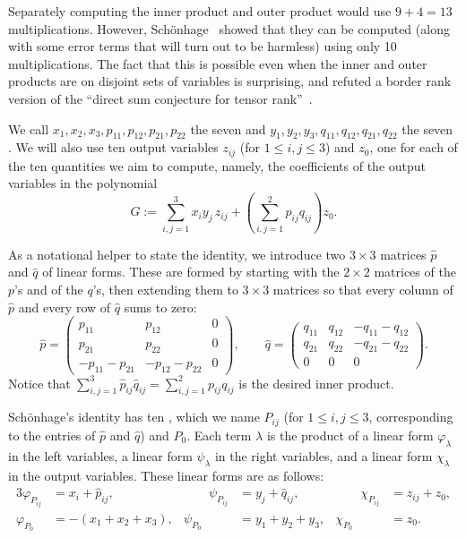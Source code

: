 Separately computing the inner product and outer product would use $9 + 4 = 13$ multiplications. However, Sch\"onhage~\cite[\S6, eq.~(6.3), with $k=n=3$]{Sch81} showed that they can be computed (along with some error terms that will turn out to be harmless) using only 10 multiplications. The fact that this is possible even when the inner and outer products are on disjoint sets of variables is surprising, and refuted a border rank version of the ``direct sum conjecture for tensor rank''~\cite{Str73}.

We call $x_1,x_2,x_3,\allowbreak p_{11},p_{12},p_{21},p_{22}$ the seven  and $y_1,y_2,y_3,\allowbreak q_{11},q_{12},q_{21},q_{22}$ the seven . We will also use ten output variables $z_{ij}$ (for $1 \leq i,j \leq 3$) and $z_0$, one for each of the ten quantities we aim to compute, namely, the coefficients of the output variables in the polynomial
\[
G:=\sum_{i,j=1}^3 x_iy_j\,z_{ij}+\left(\sum_{i,j=1}^2 p_{ij}q_{ij}\right)z_0 .
\]

As a notational helper to state the identity, we introduce two $3\times3$ matrices $\hat p$ and $\hat q$ of linear forms. These are formed by starting with the $2\times2$ matrices of the $p$'s and of the $q$'s, then extending them to $3 \times 3$ matrices so that every column of $\hat p$ and every row of $\hat q$ sums to zero:
\[
\hat p=\begin{pmatrix} p_{11}&p_{12}&0\\ p_{21}&p_{22}&0\\ -p_{11}-p_{21}&-p_{12}-p_{22}&0\end{pmatrix},\qquad
\hat q=\begin{pmatrix} q_{11}&q_{12}&-q_{11}-q_{12}\\ q_{21}&q_{22}&-q_{21}-q_{22}\\ 0&0&0\end{pmatrix}.
\]
Notice that $\sum_{i,j=1}^{3}\hat p_{ij}\hat q_{ij}=\sum_{i,j=1}^{2}p_{ij}q_{ij}$ is the desired inner product.


Sch\"onhage's identity has ten , which we name $P_{ij}$ (for $1\le i,j\le3$, corresponding to the entries of $\hat p$ and $\hat q$) and $P_0$. Each term $\lambda$ is the product of a linear form $\varphi_\lambda$ in the left variables, a linear form $\psi_\lambda$ in the right variables, and a linear form $\chi_\lambda$ in the output variables. 
These linear forms are as follows:
\begin{alignat*}{3}
\varphi_{P_{ij}}&=x_i+\hat p_{ij}, &\qquad \psi_{P_{ij}}&=y_j+\hat q_{ij}, &\qquad \chi_{P_{ij}}&=z_{ij}+z_0,\\
\varphi_{P_0}&=-(x_1+x_2+x_3), & \psi_{P_0}&=y_1+y_2+y_3, & \chi_{P_0}&=z_0.
\end{alignat*}

